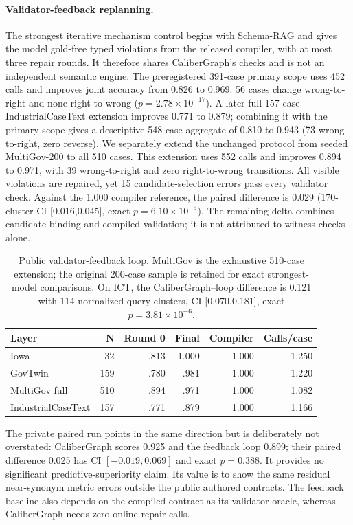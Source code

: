 \documentclass[letterpaper]{article}
\begin{document}
\paragraph{Validator-feedback replanning.}
The strongest iterative mechanism control begins with Schema-RAG and gives the model gold-free typed violations from the released compiler, with at most three repair rounds. It therefore shares CaliberGraph's checks and is not an independent semantic engine. The preregistered 391-case primary scope uses 452 calls and improves joint accuracy from 0.826 to 0.969: 56 cases change wrong-to-right and none right-to-wrong ($p=2.78\times10^{-17}$). A later full 157-case IndustrialCaseText extension improves 0.771 to 0.879; combining it with the primary scope gives a descriptive 548-case aggregate of 0.810 to 0.943 (73 wrong-to-right, zero reverse). We separately extend the unchanged protocol from seeded MultiGov-200 to all 510 cases. This extension uses 552 calls and improves 0.894 to 0.971, with 39 wrong-to-right and zero right-to-wrong transitions. All visible violations are repaired, yet 15 candidate-selection errors pass every validator check. Against the 1.000 compiler reference, the paired difference is 0.029 (170-cluster CI [0.016,0.045], exact $p=6.10\times10^{-5}$). The remaining delta combines candidate binding and compiled validation; it is not attributed to witness checks alone.

\begin{table}[t]
\centering
\scriptsize
\begin{tabular}{lrrrrr}
\toprule
Layer & N & Round 0 & Final & Compiler & Calls/case \\
\midrule
Iowa & 32 & .813 & 1.000 & 1.000 & 1.250 \\
GovTwin & 159 & .780 & .981 & 1.000 & 1.220 \\
MultiGov full & 510 & .894 & .971 & 1.000 & 1.082 \\
IndustrialCaseText & 157 & .771 & .879 & 1.000 & 1.166 \\
\bottomrule
\end{tabular}
\caption{Public validator-feedback loop. MultiGov is the exhaustive 510-case extension; the original 200-case sample is retained for exact strongest-model comparisons. On ICT, the CaliberGraph--loop difference is 0.121 with 114 normalized-query clusters, CI [0.070,0.181], exact $p=3.81\times10^{-6}$.}
\end{table}

The private paired run points in the same direction but is deliberately not overstated: CaliberGraph scores 0.925 and the feedback loop 0.899; their paired difference 0.025 has CI $[-0.019,0.069]$ and exact $p=0.388$. It provides no significant predictive-superiority claim. Its value is to show the same residual near-synonym metric errors outside the public authored contracts. The feedback baseline also depends on the compiled contract as its validator oracle, whereas CaliberGraph needs zero online repair calls.
\end{document}
